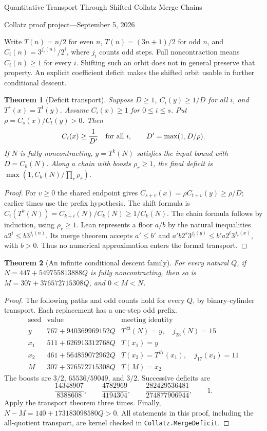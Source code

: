 \documentclass[10pt]{article}
\newtheorem{theorem}{Theorem}
\begin{document}
\begin{center}
{\Large Quantitative Transport Through Shifted Collatz Merge Chains}\par\medskip
Collatz proof project\quad---\quad September 5, 2026
\end{center}
Write $T(n)=n/2$ for even $n$, $T(n)=(3n+1)/2$ for odd $n$, and
$C_i(n)=3^{j_i(n)}/2^i$, where $j_i$ counts odd steps. Full
noncontraction means $C_i(n)\geq1$ for every $i$. Shifting such an orbit
does not in general preserve that property. An explicit coefficient
deficit makes the shifted orbit usable in further conditional descent.

\begin{theorem}[Deficit transport]
Suppose $D\geq1$, $C_i(y)\geq1/D$ for all $i$, and $T^s(x)=T^t(y)$.
Assume $C_i(x)\geq1$ for $0\leq i\leq s$. Put
$\rho=C_s(x)/C_t(y)>0$. Then
\[
 C_i(x)\geq\frac1{D'}\quad\hbox{for all }i,
 \qquad D'=\max(1,D/\rho).
\]
If $N$ is fully noncontracting, $y=T^k(N)$ satisfies the input bound
with $D=C_k(N)$. Along a chain with boosts $\rho_r\geq1$, the final
deficit is $\max(1,C_k(N)/\prod_r\rho_r)$.
\end{theorem}
\begin{proof}
For $v\geq0$ the shared endpoint gives
$C_{s+v}(x)=\rho C_{t+v}(y)\geq\rho/D$; earlier times use the prefix
hypothesis. The shift formula is
$C_i(T^k(N))=C_{k+i}(N)/C_k(N)\geq1/C_k(N)$.
The chain formula follows by induction, using $\rho_r\geq1$.
Lean represents a floor $a/b$ by the natural inequalities
$a2^i\leq b3^{j_i(n)}$. Its merge theorem accepts $a'\leq b'$ and
$a'b2^s3^{j_t(y)}\leq b'a2^t3^{j_s(x)}$, with $b>0$.
Thus no numerical approximation enters the formal transport.
\end{proof}

\begin{theorem}[An infinite conditional descent family]
For every natural $Q$, if $N=447+549755813888Q$ is fully noncontracting,
then so is $M=307+376572715308Q$, and $0<M<N$.
\end{theorem}
\begin{proof}
The following paths and odd counts hold for every $Q$, by binary-cylinder
transport. Each replacement has a one-step odd prefix.
\[
\begin{array}{c|r|l}
\text{seed}&\text{value}&\text{meeting identity}\\\hline
y&767+940369969152Q&T^{23}(N)=y,\quad j_{23}(N)=15\\
x_1&511+626913312768Q&T(x_1)=y\\
x_2&461+564859072962Q&T(x_2)=T^{17}(x_1),\quad j_{17}(x_1)=11\\
M&307+376572715308Q&T(M)=x_2
\end{array}
\]
The boosts are $3/2$, $65536/59049$, and $3/2$. Successive deficits are
\[
\frac{14348907}{8388608},\qquad
\frac{4782969}{4194304},\qquad
\frac{282429536481}{274877906944},\qquad 1.
\]
Apply the transport theorem three times. Finally,
$N-M=140+173183098580Q>0$. All statements in this proof, including the
all-quotient transport, are kernel checked in \texttt{Collatz.MergeDeficit}.
\end{proof}
\end{document}
